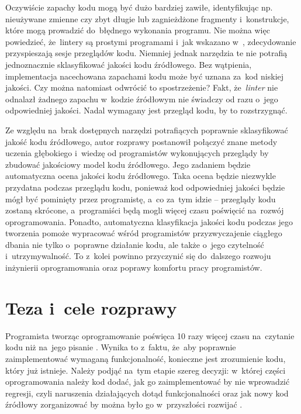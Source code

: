 \documentclass[twoside]{praca}
\begin{document}
Oczywiście zapachy kodu mogą być dużo bardziej zawiłe, identyfikując np. nieużywane zmienne czy zbyt długie lub zagnieżdżone fragmenty i~konstrukcje, które mogą prowadzić do~błędnego wykonania programu. Nie można więc powiedzieć, że~lintery są prostymi programami i~jak wskazano w~\cite{nelson2004makes}, zdecydowanie przyspieszają sesje przeglądów kodu. Niemniej jednak narzędzia te nie potrafią jednoznacznie sklasyfikować jakości kodu źródłowego. Bez wątpienia, implementacja nacechowana zapachami kodu może być uznana za~kod niskiej jakości. Czy można natomiast odwrócić to spostrzeżenie? Fakt, że~\textit{linter} nie odnalazł żadnego zapachu w~kodzie źródłowym nie świadczy od razu o~jego odpowiedniej jakości. Nadal wymagany jest przegląd kodu, by to rozstrzygnąć.

Ze względu na~brak dostępnych narzędzi potrafiących poprawnie sklasyfikować jakość kodu źródłowego, autor rozprawy postanowił połączyć znane metody uczenia głębokiego i~wiedzę od programistów wykonujących przeglądy by zbudować jakościowy model kodu źródłowego. Jego zadaniem będzie automatyczna ocena jakości kodu źródłowego. Taka ocena będzie niezwykle przydatna podczas przeglądu kodu, ponieważ kod odpowiedniej jakości będzie mógł być pominięty przez programistę, a~co za~tym idzie -- przeglądy kodu zostaną skrócone, a~programiści będą mogli więcej czasu poświęcić na~rozwój oprogramowania. Ponadto, automatyczna klasyfikacja jakości kodu podczas jego tworzenia pomoże wypracować wśród programistów przyzwyczajenie ciągłego dbania nie tylko o~poprawne działanie kodu, ale także o~jego czytelność i~utrzymywalność. To z~kolei powinno przyczynić się do~dalszego rozwoju inżynierii oprogramowania oraz poprawy komfortu pracy programistów.

\section{Teza i~cele rozprawy}
\label{sec:intro:thesis}
\label{sec:intro:aims}

Programista tworząc oprogramowanie poświęca 10 razy więcej czasu na~czytanie kodu niż na~jego pisanie \cite{martin2009clean}. Wynika to z~faktu, że~aby poprawnie zaimplementować wymaganą funkcjonalność, konieczne jest zrozumienie kodu, który już istnieje. Należy podjąć na~tym etapie szereg decyzji: w~której części oprogramowania należy kod dodać, jak go zaimplementować by nie wprowadzić regresji, czyli naruszenia działających dotąd funkcjonalności oraz jak nowy kod źródłowy zorganizować by można było go w~przyszłości rozwijać \cite{martin1996open}.
\end{document}
